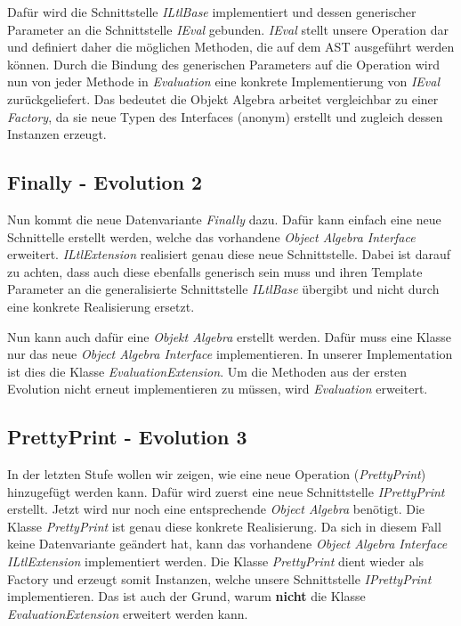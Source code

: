 \documentclass{llncs}
\begin{document}
Dafür wird die Schnittstelle \emph{ILtlBase} implementiert und dessen generischer Parameter an die Schnittstelle \emph{IEval} gebunden.
\emph{IEval} stellt unsere Operation dar und definiert daher die möglichen Methoden, die auf dem AST ausgeführt werden können.
Durch die Bindung des generischen Parameters auf die Operation wird nun von jeder Methode in \emph{Evaluation} eine konkrete Implementierung von \emph{IEval} zurückgeliefert.
Das bedeutet die Objekt Algebra arbeitet vergleichbar zu einer \emph{Factory}, da sie neue Typen des Interfaces (anonym) erstellt und zugleich dessen Instanzen erzeugt.

\subsection{Finally - Evolution 2}
Nun kommt die neue Datenvariante \emph{Finally} dazu. Dafür kann einfach eine neue Schnittelle erstellt werden, welche das vorhandene \emph{Object Algebra Interface} erweitert.
\emph{ILtlExtension} realisiert genau diese neue Schnittstelle. Dabei ist darauf zu achten,
dass auch diese ebenfalls generisch sein muss und ihren Template Parameter an die generalisierte Schnittstelle \emph{ILtlBase} übergibt und nicht durch eine konkrete Realisierung ersetzt.

Nun kann auch dafür eine \emph{Objekt Algebra} erstellt werden.
Dafür muss eine Klasse nur das neue \emph{Object Algebra Interface} implementieren. In unserer Implementation ist dies die Klasse \emph{EvaluationExtension}.
Um die Methoden aus der ersten Evolution nicht erneut implementieren zu müssen, wird \emph{Evaluation} erweitert.

\subsection{PrettyPrint - Evolution 3}
In der letzten Stufe wollen wir zeigen, wie eine neue Operation (\emph{PrettyPrint}) hinzugefügt werden kann. Dafür wird zuerst eine neue Schnittstelle \emph{IPrettyPrint} erstellt.
Jetzt wird nur noch eine entsprechende \emph{Object Algebra} benötigt. Die Klasse \emph{PrettyPrint} ist genau diese konkrete Realisierung.
Da sich in diesem Fall keine Datenvariante geändert hat, kann das vorhandene \emph{Object Algebra Interface} \emph{ILtlExtension} implementiert werden.
Die Klasse \emph{PrettyPrint} dient wieder als Factory und erzeugt somit Instanzen, welche unsere Schnittstelle \emph{IPrettyPrint} implementieren.
Das ist auch der Grund, warum \textbf{nicht} die Klasse \emph{EvaluationExtension} erweitert werden kann.
\end{document}
